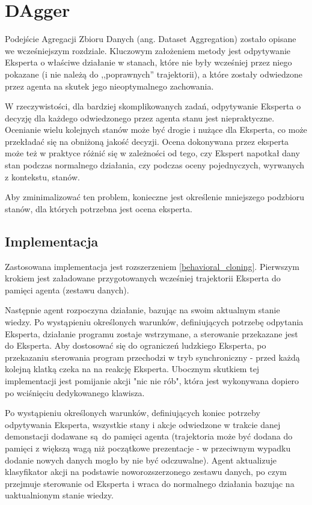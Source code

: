 \section{DAgger} 

Podejście Agregacji Zbioru Danych (ang. Dataset Aggregation) \cite{DBLP:journals/corr/abs-1011-0686} zostało opisane we wcześniejszym rozdziale. Kluczowym założeniem metody jest odpytywanie Eksperta o właściwe działanie w stanach, które nie były wcześniej przez niego pokazane (i nie należą do ,,poprawnych'' trajektorii), a które zostały odwiedzone przez agenta na skutek jego nieoptymalnego zachowania.

W rzeczywistości, dla bardziej skomplikowanych zadań, odpytywanie Eksperta o decyzję dla każdego odwiedzonego przez agenta stanu jest niepraktyczne. Ocenianie wielu kolejnych stanów może być drogie i nużące dla Eksperta, co może przekładać się na obniżoną jakość decyzji. Ocena dokonywana przez eksperta może też w praktyce różnić się w zależności od tego, czy Ekspert napotkał dany stan podczas normalnego działania, czy podczas oceny pojednyczych, wyrwanych z kontekstu, stanów.

Aby zminimalizować ten problem, konieczne jest określenie mniejszego podzbioru stanów, dla których potrzebna jest ocena eksperta.


\subsection{Implementacja} 
Zastosowana implementacja jest rozszerzeniem \ref{behavioral_cloning}. Pierwszym krokiem jest załadowane przygotowanych wcześniej trajektorii Eksperta do pamięci agenta (zestawu danych).

Następnie agent rozpoczyna działanie, bazując na swoim aktualnym stanie wiedzy. Po wystąpieniu określonych warunków, definiujących potrzebę odpytania Eksperta, działanie programu zostaje wstrzymane, a sterowanie przekazane jest do Eksperta. Aby dostosować się do ograniczeń ludzkiego Eksperta, po przekazaniu sterowania program przechodzi w tryb synchroniczny - przed każdą kolejną klatką czeka na na reakcję Eksperta. Ubocznym skutkiem tej implementacji jest pomijanie akcji "nic nie rób", która jest wykonywana dopiero po wciśnięciu dedykowanego klawisza.

Po wystąpieniu określonych warunków, definiujących koniec potrzeby odpytywania Eksperta, wszystkie stany i akcje odwiedzone w trakcie danej demonstacji dodawane są do pamięci agenta (trajektoria może być dodana do pamięci z większą wagą niż początkowe prezentacje - w przeciwnym wypadku dodanie nowych danych mogło by nie być odczuwalne). Agent aktualizuje klasyfikator akcji na podstawie noworozszerzonego zestawu danych, po czym przejmuje sterowanie od Eksperta i wraca do normalnego działania bazując na uaktualnionym stanie wiedzy.

